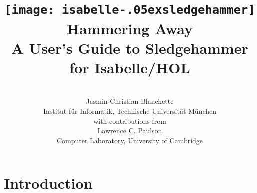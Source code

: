 \documentclass[a4paper,12pt]{article}
\renewcommand\_{\hbox{\textunderscore\kern-.05ex}}
\begin{document}
\renewcommand\labelitemi{\raise.065ex\hbox{\small\textbullet}}

\title{\texttt{[image: isabelle\_sledgehammer]} \\[4ex]
Hammering Away \\[\smallskipamount]
\Large A User's Guide to Sledgehammer for Isabelle/HOL}
\author{\hbox{} \\
Jasmin Christian Blanchette \\
{\normalsize Institut f\"ur Informatik, Technische Universit\"at M\"unchen} \\[4\smallskipamount]
{\normalsize with contributions from} \\[4\smallskipamount]
Lawrence C. Paulson \\
{\normalsize Computer Laboratory, University of Cambridge} \\
\hbox{}}

\maketitle

\tableofcontents

\setlength{\parskip}{.7em plus .2em minus .1em}
\setlength{\parindent}{0pt}
\setlength{\abovedisplayskip}{\parskip}
\setlength{\abovedisplayshortskip}{.9\parskip}
\setlength{\belowdisplayskip}{\parskip}
\setlength{\belowdisplayshortskip}{.9\parskip}

\newenvironment{enum}%
    {\begin{list}{}{%
        \setlength{\topsep}{.1\parskip}%
        \setlength{\partopsep}{.1\parskip}%
        \setlength{\itemsep}{\parskip}%
        \advance\itemsep by-\parsep}}
    {\end{list}}

\def\pre{\begingroup\vskip0pt plus1ex\advance\leftskip by\leftmargin
\advance\rightskip by\leftmargin}
\def\post{\vskip0pt plus1ex\endgroup}

\def\prew{\pre\advance\rightskip by-\leftmargin}
\def\postw{\post}

\section{Introduction}
\label{introduction}
\end{document}
